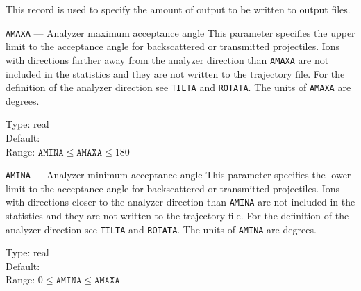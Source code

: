 This record is used to specify the amount of output to be written to output files.

\begin{keydescription}{\texttt{AMAXA} --- Analyzer maximum acceptance angle}
%
  This parameter specifies the upper limit to the acceptance angle for
  backscattered or transmitted projectiles.  Ions with directions farther away 
  from the analyzer direction than \texttt{AMAXA} are not included in the
  statistics and they are not written to the trajectory file. For the definition
  of the analyzer direction see \texttt{TILTA} and \texttt{ROTATA}. The units of
  \texttt{AMAXA} are degrees. 
  \begin{keytab}
    Type:    \> real \\
    Default:   \\
    Range:   \> $\texttt{AMINA} \le \texttt{AMAXA} \le 180$
  \end{keytab}
\end{keydescription}

\begin{keydescription}{\texttt{AMINA} --- Analyzer minimum acceptance angle}
%
  This parameter specifies the lower limit to the acceptance angle for
  backscattered or transmitted projectiles.  Ions with directions closer to 
  the analyzer direction than \texttt{AMINA} are not included in the
  statistics and they are not written to the trajectory file. For the definition
  of the analyzer direction see \texttt{TILTA} and \texttt{ROTATA}. The units of
  \texttt{AMINA} are degrees. 
  \begin{keytab}
    Type:    \> real \\
    Default:   \\
    Range:   \> $0 \le \texttt{AMINA} \le \texttt{AMAXA}$
  \end{keytab}
\end{keydescription}

